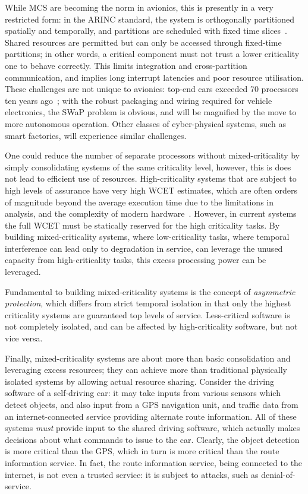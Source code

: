 While MCS are becoming the norm in avionics, this is presently in a very restricted form: in the
ARINC standard, the system
is orthogonally partitioned spatially and temporally, and partitions are scheduled with fixed time
slices~\citep{ARINC653}. Shared resources are permitted but can only be accessed through fixed-time
partitions; in other words, a critical component must not
trust a lower criticality one to behave correctly. This limits integration and cross-partition
communication, and implies long interrupt latencies and poor resource utilisation. 
These challenges are not unique to avionics: top-end cars exceeded 70 processors ten years
ago~\citep{Broy_KPS_07}; with the robust packaging and wiring required for vehicle electronics, the
SWaP problem is obvious, and will be magnified by the move to more autonomous operation. Other
classes of cyber-physical systems, such as smart factories, will experience similar challenges.

One could reduce the number of separate processors without mixed-criticality by simply consolidating 
systems of the same criticality level, however, this is does not lead to efficient use of resources. 
High-criticality systems that are subject to high levels of assurance have very high \gls{WCET} estimates,
which are often orders of magnitude beyond the average execution time due to the limitations in analysis,
and the complexity of modern hardware~\citep{Wilhelm_EEHTWBFHMMPPSS_08}. However, in current systems the full \gls{WCET} must be
statically reserved for the high criticality tasks. By building mixed-criticality systems, where
low-criticality tasks, where temporal interference can lead only to degradation in service,  can
leverage the unused capacity from high-criticality tasks, this excess
processing power can be leveraged. 

Fundamental to building mixed-criticality systems is the concept of \emph{asymmetric protection},
which differs from strict temporal isolation in that only the highest criticality systems are
guaranteed top levels of service. Less-critical software is not completely isolated, and can be
affected by high-criticality software, but not vice versa. 

Finally, mixed-criticality systems are about more than basic consolidation and leveraging excess
resources; they can achieve more
than traditional physically isolated systems by allowing actual resource sharing. 
Consider the driving software of a self-driving car: it may take inputs from various sensors
which detect objects, and also input from a \gls{GPS} navigation unit, and traffic data from an
internet-connected
service providing alternate route information. All of these systems \emph{must} provide input to the
shared driving software, which actually makes decisions about what commands to issue to the car.
Clearly, the object detection is more critical than the \gls{GPS}, which in turn is more critical than the
route information service. In fact, the route information service, being connected to the internet,
is not even a trusted service: it is subject to attacks, such as denial-of-service. 

